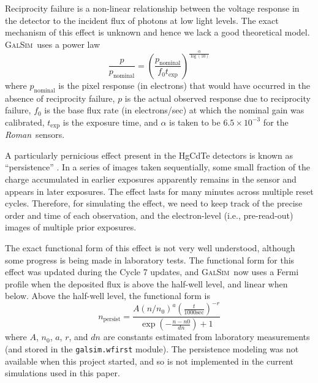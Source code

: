 \documentclass[usenatbib]{mnras}
\newcommand{\galsim}{\textsc{GalSim}}
\newcommand{\wfirst}{{\slshape Roman}}
\begin{document}
Reciprocity failure \citep{Biesiadzinski2011} is a non-linear relationship between the voltage response in the detector to the incident flux of photons at low light levels.
The exact mechanism of this effect is unknown and hence we lack a good theoretical model. 
\galsim\ uses a power law
\begin{equation}
\frac{p}{p_\mathrm{nominal}} =
 \left(\frac{p_\mathrm{nominal}}{f_0 t_\mathrm{exp}}\right)^{\frac{\alpha}{\log(10)}}
\end{equation}
where $p_\mathrm{nominal}$ is the pixel response (in electrons) that would have occurred in the absence of reciprocity failure,
$p$ is the actual observed response due to reciprocity failure,
$f_0$ is the base flux rate (in electrons/sec) at which the nominal gain was calibrated, 
$t_\mathrm{exp}$ is the exposure time,
and $\alpha$ is taken to be $6.5 \times 10^{-3}$ for the \wfirst\ sensors.

A particularly pernicious effect present in the HgCdTe detectors is known as ``persistence'' \citep{10.1117/12.789619,2014arXiv1402.4181A,2016SPIE.9915E..0GM}.  
In a series of images taken sequentially, some small fraction of the charge accumulated in earlier exposures apparently remains in the sensor and appears in later exposures.  
The effect lasts for many minutes across multiple reset cycles.  
Therefore, for simulating the effect, we need to keep track of the precise order and time of each observation, and the electron-level (i.e., pre-read-out) images of multiple prior exposures.

The exact functional form of this effect is not very well understood, although some progress is being made in laboratory tests.  
The functional form for this effect was updated during the Cycle 7 updates, and
\galsim\ now uses a Fermi profile when the deposited flux is above the half-well level, and linear when below.
Above the half-well level, the functional form is
\begin{equation}
n_\mathrm{persist} = \frac{A \left(n/n_0\right)^a  \left(\frac{t}{1000 \mathrm{sec}}\right)^{-r}}
{ \exp(- \frac{n-n0}{dn})+ 1}
\end{equation}
where $A$, $n_0$, $a$, $r$, and $dn$ are constants estimated from laboratory measurements (and stored in the \texttt{galsim.wfirst} module).
The persistence modeling was not available when this project started, and so is not implemented in the current simulations used in this paper.
\end{document}
